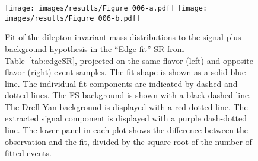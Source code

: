 \begin{figure}[!hbtp]
\centering
\texttt{[image: images/results/Figure\_006-a.pdf]}
\texttt{[image: images/results/Figure\_006-b.pdf]}
\caption{Fit of the dilepton invariant mass distributions to the signal-plus-background hypothesis in the ``Edge fit'' SR from Table~\ref{tab:edgeSR}, projected on the same flavor (left) and opposite flavor (right) event samples. The fit shape is shown as a solid blue line. The individual fit components are indicated by dashed and dotted lines. The FS background is shown with a black dashed line. The Drell-Yan background is displayed with a red dotted line. The extracted signal component is displayed with a purple dash-dotted line. The lower panel in each plot shows the difference between the observation and the fit, divided by the square root of the number of fitted events.}
\label{fig:Fit_data_H1}
\end{figure}
